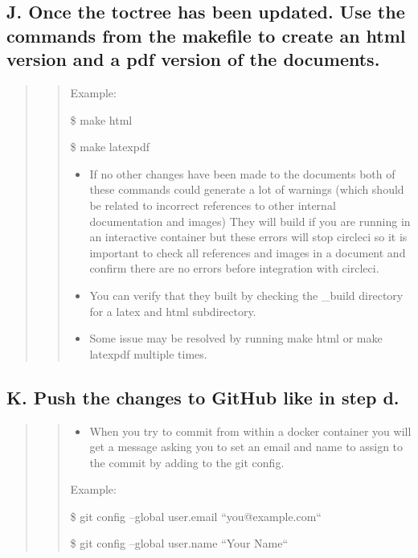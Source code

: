 \documentclass[letterpaper,10pt,english]{sphinxmanual}
\begin{document}
\subsection{J. Once the toctree has been updated. Use the commands from the makefile to create an html version and a pdf version of the documents.}
\label{docs/Process:j-once-the-toctree-has-been-updated-use-the-commands-from-the-makefile-to-create-an-html-version-and-a-pdf-version-of-the-documents}\begin{quote}
\begin{quote}

Example:

\$ make html

\$ make latexpdf
\begin{itemize}
\item {} 
If no other changes have been made to the documents both of these commands could generate a lot of warnings (which should be related to incorrect references to other internal documentation and images) They will build if you are running in an interactive container but these errors will stop circleci so it is important to check all references and images in a document and confirm there are no errors before integration with circleci.

\item {} 
You can verify that they built by checking the \_build directory for a latex and html subdirectory.

\item {} 
Some issue may be resolved by running make html or make latexpdf multiple times.

\end{itemize}
\end{quote}
\end{quote}


\subsection{K. Push the changes to GitHub like in step d.}
\label{docs/Process:k-push-the-changes-to-github-like-in-step-d}\begin{quote}
\begin{quote}
\begin{itemize}
\item {} 
When you try to commit from within a docker container you will get a message asking you to set an email and name to assign to the commit by adding to the git config.

\end{itemize}

Example:

\$ git config --global user.email ``you@example.com``

\$ git config --global user.name ``Your Name``
\end{quote}
\end{quote}
\end{document}

